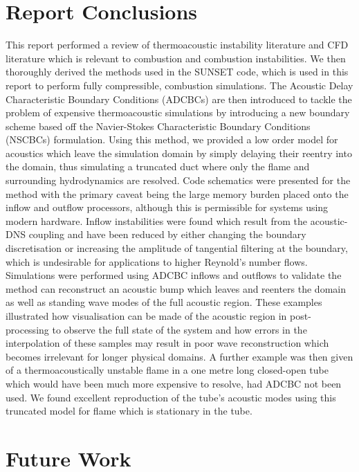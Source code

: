 \section{Report Conclusions}

This report performed a review of thermoacoustic instability literature and CFD literature which is relevant to combustion and combustion instabilities. We then thoroughly derived the methods used in the SUNSET code, which is used in this report to perform fully compressible, combustion simulations. The Acoustic Delay Characteristic Boundary Conditions (ADCBCs) are then introduced to tackle the problem of expensive thermoacoustic simulations by introducing a new boundary scheme based off the Navier-Stokes Characteristic Boundary Conditions (NSCBCs) formulation. Using this method, we provided a low order model for acoustics which leave the simulation domain by simply delaying their reentry into the domain, thus simulating a truncated duct where only the flame and surrounding hydrodynamics are resolved. Code schematics were presented for the method with the primary caveat being the large memory burden placed onto the inflow and outflow processors, although this is permissible for systems using modern hardware. Inflow instabilities were found which result from the acoustic-DNS coupling and have been reduced by either changing the boundary discretisation or increasing the amplitude of tangential filtering at the boundary, which is undesirable for applications to higher Reynold's number flows. Simulations were performed using ADCBC inflows and outflows to validate the method can reconstruct an acoustic bump which leaves and reenters the domain as well as standing wave modes of the full acoustic region. These examples illustrated how visualisation can be made of the acoustic region in post-processing to observe the full state of the system and how errors in the interpolation of these samples may result in poor wave reconstruction which becomes irrelevant for longer physical domains. A further example was then given of a thermoacoustically unstable flame in a one metre long closed-open tube which would have been much more expensive to resolve, had ADCBC not been used. We found excellent reproduction of the tube's acoustic modes using this truncated model for flame which is stationary in the tube.




\section{Future Work}

